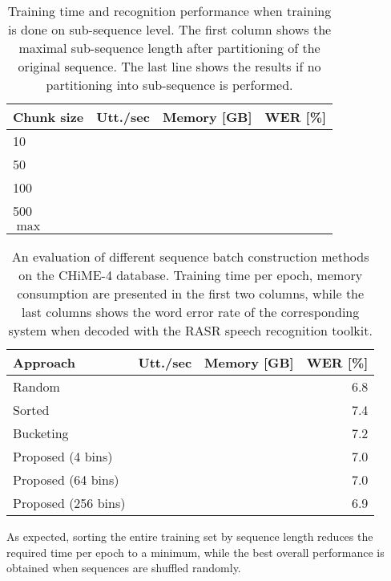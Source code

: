\documentclass{article}
\begin{document}
	\begin{table}[tbp]
		\centering
		\caption{Training time and recognition performance when training is done 
		on sub-sequence level. The first column shows the maximal sub-sequence length 
		after partitioning of the original sequence. The last line shows the results 
		if no partitioning into sub-sequence is performed. }
		\label{tab:chime:chunk}
		\begin{tabular}{lrrr}
			\hline
			Chunk size              & Utt./sec & Memory [GB] & WER [\%] \\
			\hline
			10     					&				 &			   &			 \\
			50  					&				 &			   &    		 \\
			100 					& 				 &			   &			 \\
			500						& 				 &			   &			 \\
			$\max$					&				 &			   &			 \\
			\hline
		\end{tabular}
	\end{table}

	\begin{table}[tbp]
		\centering
		\caption{An evaluation of different sequence batch construction methods on the CHiME-4 database. Training time per epoch, memory consumption are presented in the first two columns, while the last columns shows the word error rate of the corresponding system
		when decoded with the RASR speech recognition toolkit.}
		\label{tab:chime:batch}
		\begin{tabular}{lrrr}
			\hline
			Approach                & Utt./sec & Memory [GB] & WER [\%]          \\
			\hline
			Random 					&	       & 			 & 6.8		 \\
			Sorted					& 		   &			 & 7.4		 \\
			\hline
			Bucketing				&		   &			 & 7.2		 \\
			Proposed (4 bins)	    &		   &			 & 7.0		 \\
			Proposed (64 bins)	    &		   &			 & 7.0		 \\
			Proposed (256 bins)	    &		   &			 & 6.9		 \\
			\hline
		\end{tabular}
	\end{table}

  As expected, sorting the entire training set by sequence length reduces the required time 
  per epoch to a minimum, while the best overall performance is obtained when sequences are shuffled randomly.
  
\end{document}
